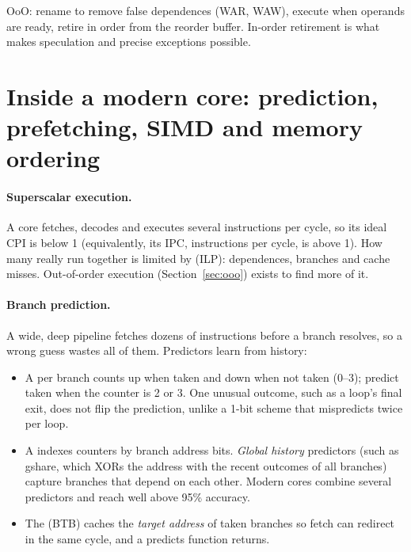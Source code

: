 \begin{remember}
OoO: rename to remove false dependences (WAR, WAW), execute when operands are ready, retire in order from the reorder buffer. In-order retirement is what makes speculation and precise exceptions possible.
\end{remember}

\section{Inside a modern core: prediction, prefetching, SIMD and memory ordering}
\label{sec:modern}

\paragraph{Superscalar execution.} A  core fetches, decodes and executes several instructions per cycle, so its ideal CPI is below 1 (equivalently, its IPC, instructions per cycle, is above 1). How many really run together is limited by  (ILP): dependences, branches and cache misses. Out-of-order execution (Section~\ref{sec:ooo}) exists to find more of it.

\paragraph{Branch prediction.} A wide, deep pipeline fetches dozens of instructions before a branch resolves, so a wrong guess wastes all of them. Predictors learn from history:
\begin{itemize}
  \item A  per branch counts up when taken and down when not taken (0--3); predict taken when the counter is 2 or 3. One unusual outcome, such as a loop's final exit, does not flip the prediction, unlike a 1-bit scheme that mispredicts twice per loop.
  \item A  indexes counters by branch address bits. \emph{Global history} predictors (such as gshare, which XORs the address with the recent outcomes of all branches) capture branches that depend on each other. Modern cores combine several predictors and reach well above 95\% accuracy.
  \item The  (BTB) caches the \emph{target address} of taken branches so fetch can redirect in the same cycle, and a  predicts function returns.
\end{itemize}

